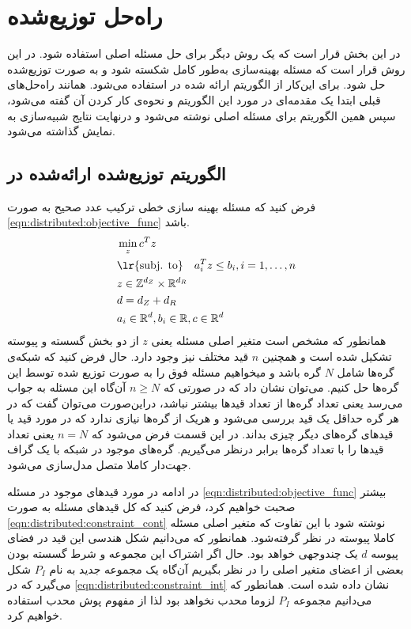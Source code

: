 \section{راه‌حل توزیع‌شده}

در این بخش قرار است که یک روش دیگر برای حل مسئله اصلی استفاده شود. در این روش قرار است که مسئله بهینه‌سازی به‌طور کامل شکسته شود و به صورت توزیع‌شده حل شود. برای این‌کار از الگوریتم ارائه شده در \cite{testa2019distributed} استفاده می‌شود. همانند راه‌حل‌های قبلی ابتدا یک مقدمه‌ای  در مورد این الگوریتم و نحوه‌ی کار کردن آن گفته می‌شود، سپس همین الگوریتم برای مسئله اصلی نوشته می‌شود و درنهایت نتایج شبیه‌سازی به نمایش گذاشته می‌شود. 
\subsection{الگوریتم توزیع‌شده ارائه‌شده در \cite{testa2019distributed}}
فرض کنید که مسئله بهینه سازی خطی ترکیب عدد صحیح به صورت \cref{eqn:distributed:objective_func} باشد.
\begin{subequations}\label{eqn:distributed:objective_func}
	\begin{align}
		&\min_{z}c^Tz  \\
		&\text{\lr{subj. to}} \quad a_i^Tz \le b_i, i = 1, \dots, n  \\
		&z \in \mathbb{Z}^{d_Z} \times \mathbb{R}^{d_R} \\
		&d = d_Z + d_R  \\
		&a_i \in \mathbb{R}^d , b_i \in \mathbb{R}, c \in \mathbb{R}^d
	\end{align}
\end{subequations}
	همانطور که مشخص است متغیر اصلی مسئله یعنی $z$ از دو بخش گسسته و پیوسته تشکیل شده است و همچنین $n$ قید مختلف نیز وجود دارد. حال فرض کنید که شبکه‌ی گره‌ها شامل $N$ گره باشد و میخواهیم مسئله فوق را به صورت توزیع شده توسط این گره‌ها حل کنیم. می‌توان نشان داد که در صورتی که $n \ge N$ آن‌گاه این مسئله به جواب می‌رسد یعنی تعداد گره‌ها از تعداد قیدها بیشتر نباشد، دراین‌صورت می‌توان گفت که در هر گره حداقل یک قید بررسی می‌شود و هریک از گره‌ها نیازی ندارد که در مورد قید یا قیدهای گره‌های دیگر چیزی بداند. در این  قسمت فرض می‌شود که $n = N$ یعنی تعداد قیدها را با تعداد گره‌ها برابر درنظر می‌گیریم. 
	گره‌های موجود در شبکه با یک گراف جهت‌دار کاملا متصل مدل‌سازی می‌شود. 
	
	در ادامه در مورد قیدهای موجود در مسئله \cref{eqn:distributed:objective_func} بیشتر صحبت خواهیم کرد، فرض کنید که کل قیدهای مسئله به صورت \cref{eqn:distributed:constraint_cont} نوشته شود با این تفاوت که متغیر اصلی مسئله کاملا پیوسته در نظر گرفته‌شود. همانطور که می‌دانیم شکل هندسی این قید در فضای پیوسه $d$ یک چندوجهی خواهد بود. حال اگر اشتراک این مجموعه و شرط گسسته بودن بعضی از اعضای متغیر اصلی را در نظر بگیریم آن‌گاه یک مجموعه جدید به نام $P_I$ شکل می‌گیرد که در \cref{eqn:distributed:constraint_int} نشان داده شده است. همانطور که می‌دانیم مجموعه $P_I$ لزوما محدب نخواهد بود لذا از مفهوم پوش محدب استفاده خواهیم کرد. 
	
